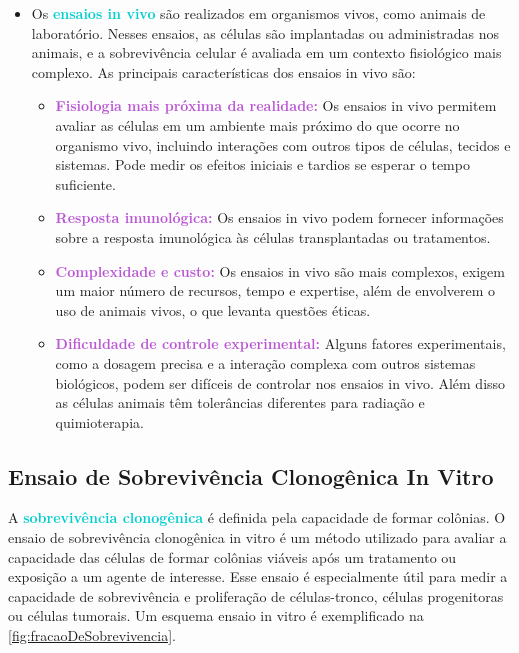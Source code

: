 \documentclass[11pt,a4paper]{article}
\begin{document}
\begin{itemize}[label=\textcolor{CarnationPink}{$\blacktriangleright$}]
		\item Os \textcolor{DarkTurquoise}{\LobsterTwo\textbf{ensaios in vivo}} são realizados em organismos vivos, como animais de laboratório. Nesses ensaios, as células são implantadas ou administradas nos animais, e a sobrevivência celular é avaliada em um contexto fisiológico mais complexo. As principais características dos ensaios in vivo são:
		\begin{itemize}[label=\textcolor{CarnationPink}{$\star$}]
			\item \textcolor{MediumOrchid}{\textbf{Fisiologia mais próxima da realidade:}} Os ensaios in vivo permitem avaliar as células em um ambiente mais próximo do que ocorre no organismo vivo, incluindo interações com outros tipos de células, tecidos e sistemas. Pode medir os efeitos iniciais e tardios se esperar o tempo suficiente.
			\item \textcolor{MediumOrchid}{\textbf{Resposta imunológica:}} Os ensaios in vivo podem fornecer informações sobre a resposta imunológica às células transplantadas ou tratamentos.
			\item \textcolor{MediumOrchid}{\textbf{Complexidade e custo:}} Os ensaios in vivo são mais complexos, exigem um maior número de recursos, tempo e expertise, além de envolverem o uso de animais vivos, o que levanta questões éticas.
			\item \textcolor{MediumOrchid}{\textbf{Dificuldade de controle experimental:}} Alguns fatores experimentais, como a dosagem precisa e a interação complexa com outros sistemas biológicos, podem ser difíceis de controlar nos ensaios in vivo. Além disso as células animais têm tolerâncias diferentes para radiação e quimioterapia.
		\end{itemize}
	\end{itemize}


\subsection{Ensaio de Sobrevivência Clonogênica In Vitro}

	A \textcolor{DarkTurquoise}{\textbf{sobrevivência clonogênica}} é definida pela capacidade de formar colônias. O ensaio de sobrevivência clonogênica in vitro é um método utilizado para avaliar a capacidade das células de formar colônias viáveis após um tratamento ou exposição a um agente de interesse. Esse ensaio é especialmente útil para medir a capacidade de sobrevivência e proliferação de células-tronco, células progenitoras ou células tumorais. Um esquema ensaio in vitro é exemplificado na \ref{fig:fracaoDeSobrevivencia}.
\end{document}
